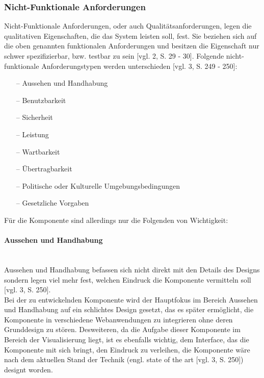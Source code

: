 \documentclass[12pt]{article}
\begin{document}
		\subsubsection{Nicht-Funktionale Anforderungen}
			Nicht-Funktionale Anforderungen, oder auch Qualitätsanforderungen, legen die
			qualitativen Eigenschaften, die das System leisten soll, fest. Sie beziehen
			sich auf die oben genannten funktionalen Anforderungen und besitzen die
			Eigenschaft nur schwer spezifizierbar, bzw. testbar zu sein [vgl.
			2, S. 29 - 30]. Folgende nicht-funktionale
			Anforderungstypen werden unterschieden [vgl. 3, S. 249 - 250]:
			\begin{itemize}
			  \setlength{\itemsep}{2pt}
			  \item[--] Aussehen und Handhabung
			  \item[--] Benutzbarkeit
			  \item[--] Sicherheit
			  \item[--] Leistung
			  \item[--] Wartbarkeit
			  \item[--] Übertragbarkeit
			  \item[--] Politische oder Kulturelle Umgebungsbedingungen
			  \item[--] Gesetzliche Vorgaben
			\end{itemize}
			Für die Komponente sind allerdings nur die Folgenden von Wichtigkeit:
			
			\paragraph{Aussehen und Handhabung} $\;$ \\[0.3cm]
			Aussehen und Handhabung befassen sich nicht direkt mit den Details des
			Designs sondern legen viel mehr fest, welchen Eindruck die Komponente
			vermitteln soll [vgl. 3, S. 250].\\[0.2cm]
			Bei der zu entwickelnden Komponente wird der Hauptfokus im Bereich Aussehen
			und Handhabung auf ein schlichtes Design gesetzt, das es später ermöglicht,
			die Komponente in verschiedene Webanwendungen zu integrieren ohne deren
			Grunddesign zu stören. Desweiteren, da die Aufgabe dieser Komponente im
			Bereich der Visualisierung liegt, ist es ebenfalls wichtig, dem
			Interface, das die Komponente mit sich bringt, den Eindruck zu verleihen, die
			Komponente wäre nach dem aktuellen Stand der Technik (engl. state of the art
			[vgl. 3, S. 250]) designt worden.
			
\end{document}
